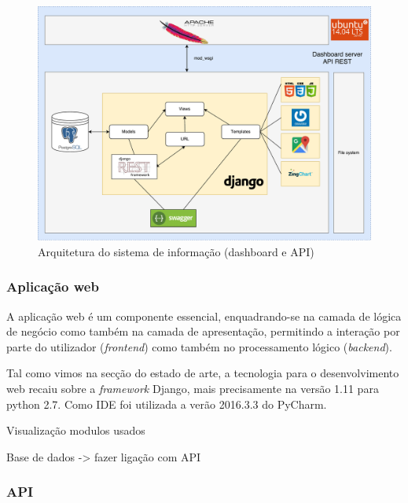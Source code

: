 \begin{figure}[h]
	\centering
	\includegraphics[width=\linewidth]{esquemas/fisica-si.pdf}
	\caption{Arquitetura do sistema de informação (dashboard e API)}
	\label{arquiteturasi}
\end{figure}


\subsubsection{Aplicação web}

A aplicação web é um componente essencial, enquadrando-se na camada de lógica de negócio como também na camada de apresentação, permitindo a interação por parte do utilizador (\textit{frontend}) como também no processamento lógico (\textit{backend}).   

Tal como vimos na secção do estado de arte, a tecnologia para o desenvolvimento web recaiu sobre a \textit{framework} Django, mais precisamente na versão 1.11 para python 2.7. Como \ac{IDE} foi utilizada a verão 2016.3.3 do PyCharm. 


Visualização modulos usados 




Base de dados -> fazer ligação com API 














\subsubsection{\ac{API}}


